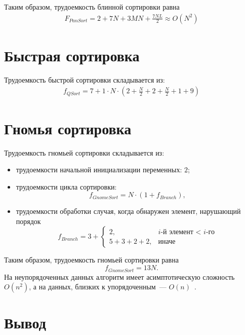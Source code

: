 Таким образом, трудоемкость блинной сортировки равна
\begin{equation}
    \begin{gathered}
        F_{PanSort} = 2 + 7N + 3MN + \frac{7NL}{2} \approx O(N^2)
    \end{gathered}
\end{equation}

\section{Быстрая сортировка}

Трудоемкость быстрой сортировки складывается из:
\begin{equation}
    \begin{gathered}
        f_{QSort} = 7 + 1 \cdot N \cdot (2 + \frac{N}{2} + 2 + \frac{N}{2} + 1 + 9)
    \end{gathered}
\end{equation}

\section{Гномья сортировка}

Трудоемкость гномьей сортировки складывается из:
\begin{itemize}
    \item трудоемкости начальной инициализации переменных: $2$;
    \item трудоемкости цикла сортировки:
    \begin{equation}
        f_{GnomeSort} = N \cdot (1 + f_{Branch}),
    \end{equation}
    \item трудоемкости обработки случая, когда обнаружен элемент, нарушающий порядок
    \begin{equation}
        f_{Branch} = 3 + 
        \begin{cases}
            2, & \text{$i$-й элемент < $i$-го}\\
            5 + 3 + 2 + 2, & \text{иначе}
        \end{cases}
    \end{equation}
\end{itemize}

Таким образом, трудоемкость гномьей сортировки равна
\begin{equation}
    f_{GnomeSort} = 13N.
\end{equation}
На неупорядоченных данных алгоритм имеет асимптотическую сложность $O(n^2)$, а на данных, близких к упорядоченным~--- $O(n)$~\cite{gnome-complexity}.

\section*{Вывод}
